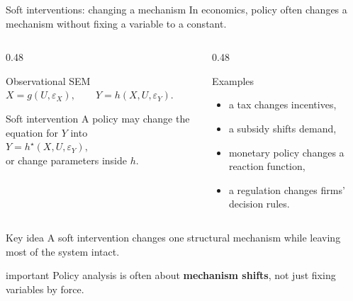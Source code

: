 \documentclass[dvipsnames,aspectratio=169,handout]{beamer}
\begin{document}
\begin{frame}{Soft interventions: changing a mechanism}
In economics, policy often changes a mechanism without fixing a variable to a constant.

\begin{columns}[T]
\begin{column}{0.48\textwidth}
\begin{block}{Observational SEM}
$
X = g(U,\varepsilon_X),
\qquad
Y = h(X,U,\varepsilon_Y).
$
\end{block}

\begin{block}{Soft intervention}
A policy may change the equation for $Y$ into\\
\qquad \qquad $
Y = h^\star(X,U,\varepsilon_Y),
$\\
or change parameters inside $h$.
\end{block}
\end{column}

\begin{column}{0.48\textwidth}
\begin{exampleblock}{Examples}
\begin{itemize}
    \item a tax changes incentives,
    \item a subsidy shifts demand,
    \item monetary policy changes a reaction function,
    \item a regulation changes firms' decision rules.
\end{itemize}
\end{exampleblock}
\end{column}
\end{columns}

\begin{alertblock}{Key idea}
A soft intervention changes one structural mechanism while leaving most of the system intact.
\end{alertblock}

\begin{beamercolorbox}[wd=\textwidth,sep=7pt,center,rounded=true,shadow=true]{important}
Policy analysis is often about \textbf{mechanism shifts}, not just fixing variables by force.
\end{beamercolorbox}
\end{frame}
\end{document}
